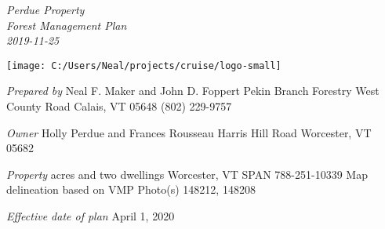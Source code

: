\documentclass[]{tufte-handout}
\date{}
\begin{document}
\thispagestyle{empty}

\LARGE \emph{Perdue Property}\\
\Large \emph{Forest Management Plan}\\
\Large \emph{2019-11-25}

\begin{marginfigure}

{\centering \texttt{[image: C:/Users/Neal/projects/cruise/logo-small]} 

}

\end{marginfigure}

\normalsize 

\begin{marginfigure}
\noindent \textit{\large Prepared by} 
\newline\indent Neal F. Maker and John D. Foppert  
\newline\indent Pekin Branch Forestry  
\newline{} West County Road  
\newline\indent Calais, VT 05648  
\newline\indent (802) 229-9757  
\end{marginfigure}

\begin{marginfigure}
\noindent \textit{\large Owner}
\newline\indent Holly Perdue and Frances Rousseau  
\newline{} Harris Hill Road
\indent 
\newline\indent Worcester, VT 05682  
\end{marginfigure}

\begin{marginfigure}
\noindent \textit{\large Property}   
\newline{} acres and two dwellings   
\newline\indent Worcester, VT  
\newline\indent SPAN 788-251-10339  
\newline\indent Map delineation based on VMP  
\newline\indent Photo(s) 148212, 148208  
\end{marginfigure}

\begin{marginfigure}
\noindent \textit{\large Effective date of plan}  
\newline\indent April 1, 2020  
\end{marginfigure}
\end{document}
